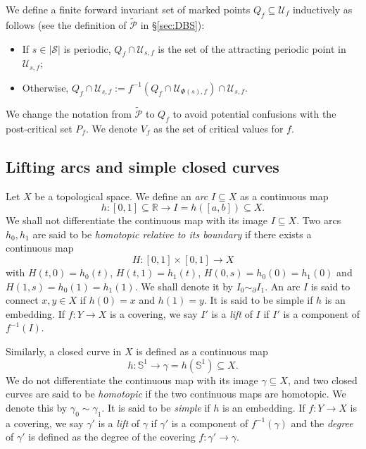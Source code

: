\documentclass[11pt, reqno]{amsart}
\numberwithin{equation}{section}
\theoremstyle{plain}
\theoremstyle{theorem}
\theoremstyle{definition}
\newcommand{\R}{\mathbb{R}}
\newcommand{\U}{\mathcal{U}}
\numberwithin{figure}{section}
\begin{document}
We define a finite forward invariant set of marked points $Q_f \subseteq \U_f$ inductively as follows (see the definition of $\widetilde{\mathcal{P}}$ in \S \ref{sec:DBS}):
\begin{itemize}
\item If $s\in |\mathcal{S}|$ is periodic, $Q_f \cap \U_{s, f}$ is the set of the attracting periodic point in $\U_{s, f}$;
\item Otherwise, $Q_f \cap \U_{s, f} := f^{-1}(Q_f \cap \U_{\Phi(s), f}) \cap \U_{s, f}$.
\end{itemize}
We change the notation from $\widetilde{\mathcal{P}}$ to $Q_f$ to avoid potential confusions with the post-critical set $P_f$.
We denote $V_f$ as the set of critical values for $f$.

\subsection{Lifting arcs and simple closed curves}
Let $X$ be a topological space. We define an {\em arc} $I\subseteq X$ as a continuous map 
$$
h: [0,1] \subseteq \R \longrightarrow I = h([a,b]) \subseteq X.
$$
We shall not differentiate the continuous map with its image $I\subseteq X$.
Two arcs $h_0, h_1$ are said to be {\em homotopic relative to its boundary} if
there exists a continuous map 
$$
H: [0,1]\times [0,1] \longrightarrow X
$$ 
with $H(t, 0) = h_0(t)$, $H(t,1) = h_1(t)$, $H(0, s) = h_0(0) = h_1(0)$ and $H(1,s) = h_0(1) = h_1(1)$.
We shall denote it by $I_0 \sim_\partial I_1$.
An arc $I$ is said to connect $x, y\in X$ if $h(0) = x$ and $h(1) = y$.
It is said to be simple if $h$ is an embedding.
If $f: Y\longrightarrow X$ is a covering, we say $I'$ is a {\em lift} of $I$ if $I'$ is a component of $f^{-1}(I)$.

Similarly, a closed curve in $X$ is defined as a continuous map 
$$
h: \mathbb{S}^1 \longrightarrow \gamma = h(\mathbb{S}^1) \subseteq X.
$$
We do not differentiate the continuous map with its image $\gamma\subseteq X$, and two closed curves are said to be {\em homotopic} if the two continuous maps are homotopic.
We denote this by $\gamma_0 \sim \gamma_1$.
It is said to be {\em simple} if $h$ is an embedding.
If $f: Y\longrightarrow X$ is a covering, we say $\gamma'$ is a {\em lift} of $\gamma$ if $\gamma'$ is a component of $f^{-1}(\gamma)$ and the {\em degree} of $\gamma'$ is defined as the degree of the covering $f: \gamma' \longrightarrow \gamma$.
\end{document}
